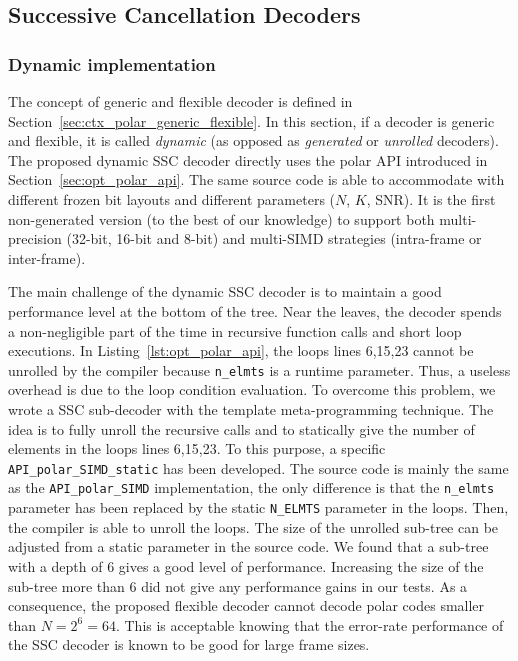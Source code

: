\subsection{Successive Cancellation Decoders}
\label{sec:opt_polar_sc}

\subsubsection{Dynamic implementation}

The concept of generic and flexible decoder is defined in
Section~\ref{sec:ctx_polar_generic_flexible}. In this section, if a decoder is
generic and flexible, it is called \emph{dynamic} (as opposed as
\emph{generated} or \emph{unrolled} decoders). The proposed dynamic SSC decoder
directly uses the polar API introduced in Section~\ref{sec:opt_polar_api}. The
same source code is able to accommodate with different frozen bit layouts and
different parameters ($N$, $K$, SNR). It is the first non-generated version (to
the best of our knowledge) to support both multi-precision (32-bit, 16-bit and
8-bit) and multi-SIMD strategies (intra-frame or inter-frame).

The main challenge of the dynamic SSC decoder is to maintain a good performance
level at the bottom of the tree. Near the leaves, the decoder spends a
non-negligible part of the time in recursive function calls and short loop
executions. In Listing~\ref{lst:opt_polar_api}, the loops lines 6,15,23 cannot
be unrolled by the compiler because \verb|n_elmts| is a runtime parameter. Thus,
a useless overhead is due to the loop condition evaluation. To overcome this
problem, we wrote a SSC sub-decoder with the template meta-programming
technique. The idea is to fully unroll the recursive calls and to statically
give the number of elements in the loops lines 6,15,23. To this purpose, a
specific \verb|API_polar_SIMD_static| has been developed. The source code is
mainly the same as the \verb|API_polar_SIMD| implementation, the only difference
is that the \verb|n_elmts| parameter has been replaced by the static
\verb|N_ELMTS| parameter in the loops. Then, the compiler is able to unroll
the loops. The size of the unrolled sub-tree can be adjusted from a static
parameter in the source code. We found that a sub-tree with a depth of 6 gives
a good level of performance. Increasing the size of the sub-tree more than 6 did
not give any performance gains in our tests. As a consequence, the proposed
flexible decoder cannot decode polar codes smaller than $N = 2^6 = 64$. This is
acceptable knowing that the error-rate performance of the SSC decoder is known
to be good for large frame sizes.

